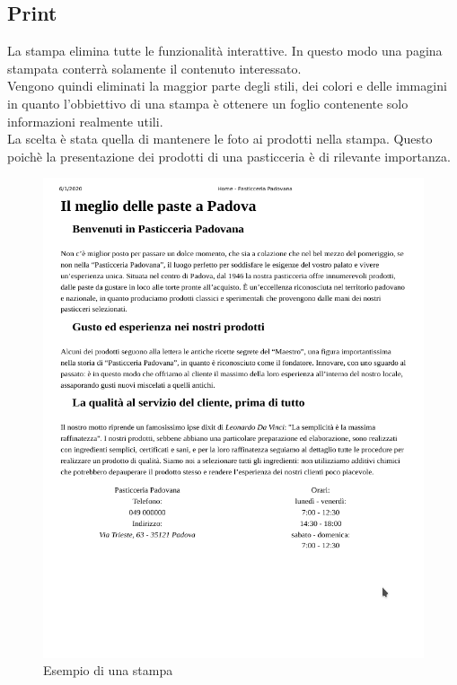 \subsection{Print}
La stampa elimina tutte le funzionalità interattive. In questo modo una pagina stampata conterrà solamente il contenuto interessato.\\
Vengono quindi eliminati la maggior parte degli stili, dei colori e delle immagini in quanto l'obbiettivo di una stampa è ottenere un foglio 
contenente solo informazioni realmente utili.\\
La scelta è stata quella di mantenere le foto ai prodotti nella stampa. Questo poichè la presentazione dei prodotti di una pasticceria è di rilevante importanza.\\
\begin{figure}[!h]
    \centering		  
	\includegraphics[width=0.8\linewidth]{sezioni/Progettazione/Immagini/print_example.png}
	\caption{Esempio di una stampa}
	\label{Fig:verPrint}
\end{figure}


\newpage